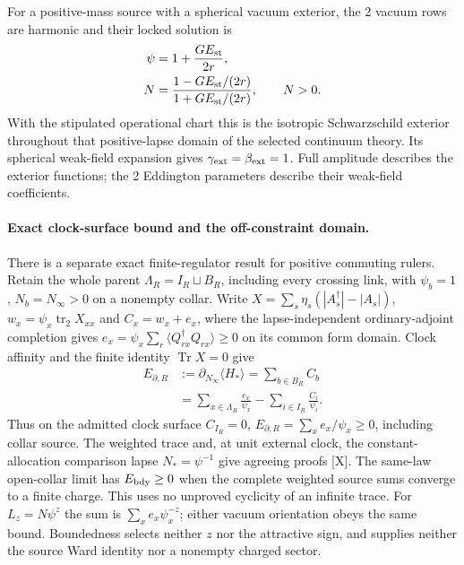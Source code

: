 For a positive-mass source with a spherical vacuum exterior, the
2 vacuum rows are harmonic and their locked solution is
\begin{equation}\label{eq:one-h-schwarzschild}
 \begin{aligned}
 \psi&=1+\frac{GE_{\rm st}}{2r},\\
 N&=\frac{1-GE_{\rm st}/(2r)}{1+GE_{\rm st}/(2r)},\qquad N>0.
 \end{aligned}
\end{equation}
With the stipulated operational chart this is the isotropic
Schwarzschild exterior throughout that positive-lapse domain of the
selected continuum theory.  Its spherical weak-field expansion gives
$\gamma_{\rm ext}=\beta_{\rm ext}=1$.  Full amplitude describes
the exterior functions; the 2 Eddington parameters describe their
weak-field coefficients.

\paragraph*{Exact clock-surface bound and the off-constraint domain.}
There is a separate exact finite-regulator result for positive
commuting rulers.  Retain the whole parent
$\Lambda_R=I_R\sqcup B_R$, including every crossing link, with
$\psi_b=1$, $N_b=N_\infty>0$ on a nonempty collar.
Write $X=\sum_s\eta_s(|A_s^\dagger|-|A_s|)$,
$w_x=\psi_x\operatorname{tr}_2X_{xx}$ and
$C_x=w_x+e_x$, where the lapse-independent ordinary-adjoint
completion gives
$e_x=\psi_x\sum_r\langle Q_{rx}^\dagger Q_{rx}\rangle\ge0$
on its common form domain.  Clock affinity and the finite identity
$\operatorname{Tr}X=0$ give
\begin{equation}\label{eq:bridgeconditions-collar-bound}
 \begin{aligned}
 E_{\partial,R}
 &:=\partial_{N_\infty}\langle H_*\rangle
   =\sum_{b\in B_R}C_b\\
 &=\sum_{x\in\Lambda_R}\frac{e_x}{\psi_x}
      -\sum_{i\in I_R}\frac{C_i}{\psi_i}.
 \end{aligned}
\end{equation}
Thus on the admitted clock surface $C_{I_R}=0$,
$E_{\partial,R}=\sum_xe_x/\psi_x\ge0$, including collar source.
The weighted trace and, at unit external clock, the
constant-allocation comparison lapse $N_*=\psi^{-1}$
give agreeing proofs [X].
The same-law open-collar limit has $E_{\rm bdy}\ge0$ when the
complete weighted source sums converge to a finite charge.
This uses no unproved cyclicity of an infinite trace.
For $L_z=N\psi^z$ the sum is $\sum_xe_x\psi_x^{-z}$;
either vacuum orientation obeys the same bound.
Boundedness selects neither $z$ nor the attractive sign, and supplies
neither the source Ward identity nor a nonempty charged sector.

